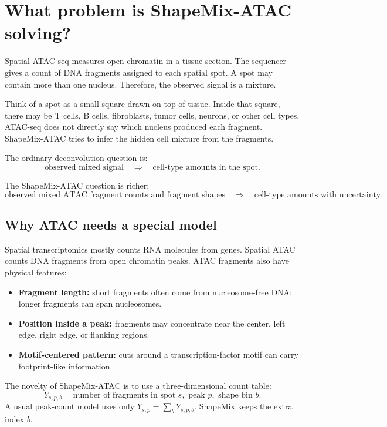 \documentclass[11pt]{article}
\begin{document}
\tableofcontents
\newpage

\section{What problem is ShapeMix-ATAC solving?}

Spatial ATAC-seq measures open chromatin in a tissue section.  The sequencer gives a count of DNA fragments assigned to each spatial spot.  A spot may contain more than one nucleus.  Therefore, the observed signal is a mixture.

\begin{bio}
Think of a spot as a small square drawn on top of tissue.  Inside that square, there may be T cells, B cells, fibroblasts, tumor cells, neurons, or other cell types.  ATAC-seq does not directly say which nucleus produced each fragment.  ShapeMix-ATAC tries to infer the hidden cell mixture from the fragments.
\end{bio}

The ordinary deconvolution question is:
\[
\text{observed mixed signal} \quad \Longrightarrow \quad \text{cell-type amounts in the spot}.
\]

The ShapeMix-ATAC question is richer:
\[
\text{observed mixed ATAC fragment counts and fragment shapes}
\quad \Longrightarrow \quad
\text{cell-type amounts with uncertainty}.
\]

\subsection{Why ATAC needs a special model}

Spatial transcriptomics mostly counts RNA molecules from genes.  Spatial ATAC counts DNA fragments from open chromatin peaks.  ATAC fragments also have physical features:

\begin{itemize}[leftmargin=2em]
    \item \textbf{Fragment length:} short fragments often come from nucleosome-free DNA; longer fragments can span nucleosomes.
    \item \textbf{Position inside a peak:} fragments may concentrate near the center, left edge, right edge, or flanking regions.
    \item \textbf{Motif-centered pattern:} cuts around a transcription-factor motif can carry footprint-like information.
\end{itemize}

\begin{idea}
The novelty of ShapeMix-ATAC is to use a three-dimensional count table:
\[
\boxed{Y_{s,p,b} = \text{number of fragments in spot } s,\text{ peak } p,\text{ shape bin } b.}
\]
A usual peak-count model uses only \(Y_{s,p}=\sum_b Y_{s,p,b}\).  ShapeMix keeps the extra index \(b\).
\end{idea}
\end{document}
